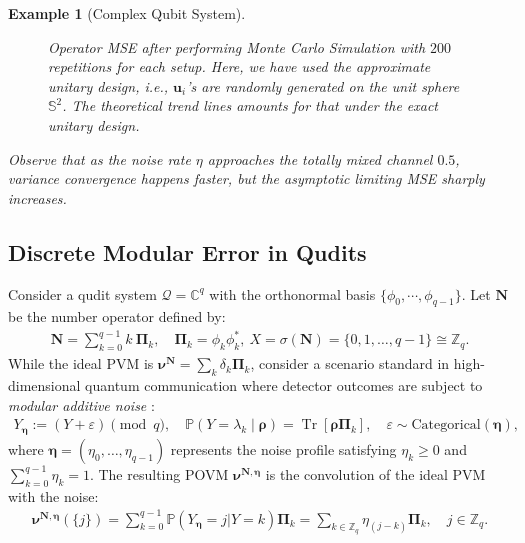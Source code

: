 \documentclass[noinfoline]{imsart}\setcounter{tocdepth}{2}
\renewcommand{\b}[1]{\mathbb{#1}} %
\newcommand{\m}[1]{\mathbf{#1}} %
\renewcommand{\c}[1]{\mathcal{#1}} %
\newcommand{\mb}[1]{\boldsymbol{#1}} %
\newcommand{\tr}[1]{\operatorname{Tr}\left[#1\right]}
\theoremstyle{plain}
\newtheorem{example}[theorem]{Example}
\begin{document}
\begin{appendix}
\begin{example}[Complex Qubit System]
\begin{figure}[h!]
    \caption{Operator MSE after performing Monte Carlo Simulation with $200$ repetitions for each setup. Here, we have used the approximate unitary design, i.e., $\m{u}_{i}$'s are randomly generated on the unit sphere $\b{S}^{2}$. The theoretical trend lines amounts for that under the exact unitary design.}
    \label{fig:mse:eta}
\end{figure}

Observe that as the noise rate $\eta$ approaches the totally mixed channel $0.5$, variance convergence happens faster, but the asymptotic limiting MSE sharply increases.
\end{example}


\subsection{Discrete Modular Error in Qudits}\label{ssec:qudit:povm} 
Consider a qudit system $\c{Q} = \b{C}^{q}$ with the orthonormal basis $\{\phi_{0}, \cdots, \phi_{q-1}\}$. Let $\m{N}$ be the number operator defined by: 
\begin{align}\label{eq:numb:op}
    \m{N} = \sum_{k=0}^{q-1} k \ \m{\Pi}_k, \quad \m{\Pi}_k = \phi_{k} \phi_{k}^{*}, \ X = \sigma(\m{N}) = \{0, 1, \dots, q-1\} \cong \b{Z}_{q}.
\end{align}
While the ideal PVM is $\mb{\nu}^{\m{N}} = \sum_{k} \delta_k \m{\Pi}_k$, consider a scenario standard in high-dimensional quantum communication where detector outcomes are subject to \emph{modular additive noise} \cite{gottesman2001encoding}:
\begin{align*}
    Y_{\mb{\eta}} := (Y + \varepsilon) \pmod q, \quad \b P(Y=\lambda_k\mid\mb\rho)=\tr{\mb{\rho} \m{\Pi}_{k}}, \quad \varepsilon \sim \text{Categorical}(\mb{\eta}) ,
\end{align*} 
where $\mb{\eta} = (\eta_0, \dots, \eta_{q-1})$ represents the noise profile satisfying $\eta_{k} \ge 0$ and $\sum_{k=0}^{q-1} \eta_{k} = 1$. The resulting POVM $\mb{\nu}^{\m{N}, \mb{\eta}}$ is the convolution of the ideal PVM with the noise: 
\begin{align*}
    \mb{\nu}^{\m{N}, \mb{\eta}}(\{j\}) = \sum_{k=0}^{q-1} \b{P}(Y_{\mb{\eta}}=j | Y=k) \m{\Pi}_{k} = \sum_{k \in \b{Z}_{q}} \eta_{(j-k)}  \m{\Pi}_{k}, \quad j \in \b{Z}_{q}.
\end{align*}


\end{appendix}
\end{document}
